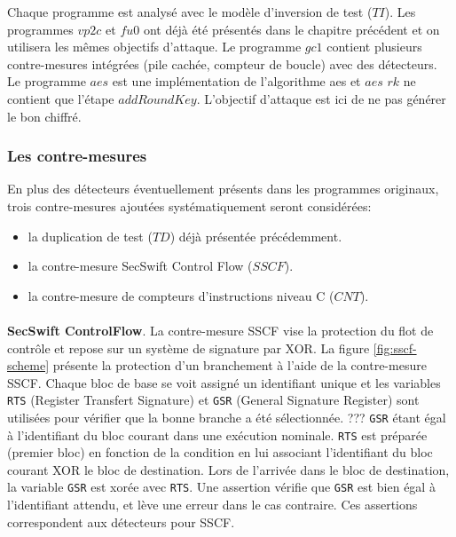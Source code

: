                 Chaque programme est analysé avec le modèle d'inversion de test ($TI$).
                Les programmes $vp2c$ et $fu0$ ont déjà été présentés dans le chapitre précédent et on utilisera les mêmes objectifs d'attaque.
                Le programme $gc1$ contient plusieurs contre-mesures intégrées (pile cachée, compteur de boucle) avec des détecteurs.
                Le programme $aes$ est une implémentation de l'algorithme \gls{aes} et $aes$ $rk$ ne contient que l'étape $addRoundKey$. L'objectif d'attaque est ici de ne pas générer le bon chiffré.
            
            \subsubsection{Les contre-mesures}
            \label{sec:ch6:exp:cms}
            
                En plus des détecteurs éventuellement présents dans les programmes originaux, trois contre-mesures ajoutées systématiquement seront considérées:
                \begin{itemize}
                    \item la duplication de test ($TD$) déjà présentée précédemment.
                    \item la contre-mesure SecSwift Control Flow \cite{Ferriere/LLVM19} ($SSCF$).
                    \item la contre-mesure de compteurs d'instructions niveau C \cite{lalande} ($CNT$).
                \end{itemize}
            
                \paragraph{}\textbf{SecSwift ControlFlow}. La contre-mesure \gls{SSCF} vise la protection du flot de contrôle et repose sur un système de signature par XOR.
                La figure \ref{fig:sscf-scheme} présente la protection d'un branchement à l'aide de la contre-mesure \gls{SSCF}. 
                Chaque bloc de base se voit assigné un identifiant unique et les variables \texttt{RTS} (Register Transfert Signature) et \texttt{GSR} (General Signature Register) sont utilisées pour vérifier que la bonne branche a été sélectionnée. ??? 
                \texttt{GSR} étant égal à l'identifiant du bloc courant dans une exécution nominale.
                \texttt{RTS} est préparée (premier bloc) en fonction de la condition en lui associant l'identifiant du bloc courant XOR le bloc de destination.
                Lors de l'arrivée dans le bloc de destination, la variable \texttt{GSR} est xorée avec \texttt{RTS}.
                Une assertion vérifie que \texttt{GSR} est bien égal à l'identifiant attendu, et lève une erreur dans le cas contraire. Ces assertions correspondent aux détecteurs pour \gls{SSCF}.         


